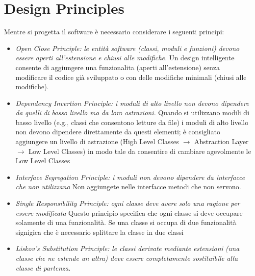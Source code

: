 \documentclass{article}
\begin{document}
\maketitle



\newpage
\tableofcontents
\newpage

\section{Design Principles}
Mentre si progetta il software \`e necessario considerare i seguenti principi:
\begin{itemize}
\item \emph{Open Close Principle: le entit\`a software (classi, moduli e funzioni) devono essere aperti all'estensione e chiusi alle modifiche.}
Un design intelligente consente di aggiungere una funzionalita (aperti all'estensione) senza modificare il codice gi\`a sviluppato o con delle modifiche minimali (chiusi alle modifiche).
\item \emph{Dependency Invertion Principle: i moduli di alto livello non devono dipendere da quelli di basso livello ma da loro astrazioni.}
Quando si utilizzano modili di basso livello (e.g., classi che consentono letture da file) i moduli di alto livello non devono dipendere direttamente da questi elementi; \`e consigliato aggiungere un livello di astrazione (High Level Classes $\rightarrow$ Abstraction Layer $\rightarrow$ Low Level Classes) in modo tale da consentire di cambiare agevolmente le Low Level Classes
\item \emph{Interface Segregation Principle: i moduli non devono dipendere da interfacce che non utilizzano} Non aggiungete nelle interfacce metodi che non servono.
\item \emph{Single Responsibility Principle: ogni classe deve avere solo una ragione per essere modificata} 
Questo principio specifica che ogni classe si deve occupare solamente di una funzionalit\`a. 
Se una classe si occupa di due funzionalit\`a signigica che \`e necessario splittare la classe in due classi
\item \emph{Liskov's Substitution Principle: le classi derivate mediante estensioni (una classe che ne estende un altra) deve essere completamente sostituibile alla classe di partenza}.
 
\end{itemize}
\end{document}
